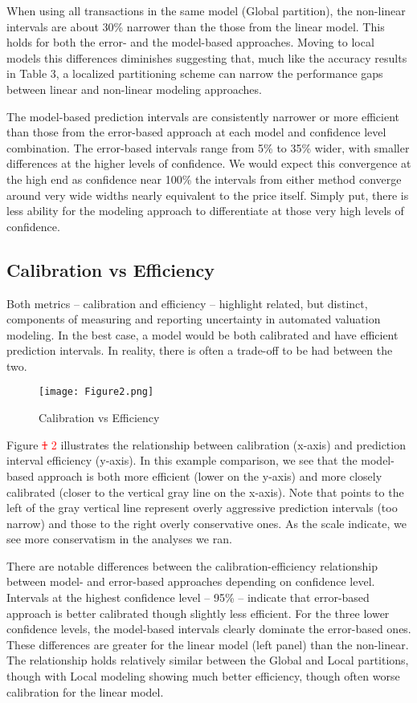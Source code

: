 \documentclass[colTwo]{anon}
\theoremstyle{definition}
\begin{document}
When using all transactions in the same model (Global partition), the non-linear intervals are about 30\% narrower than the those from the linear model.  This holds for both the error- and the model-based approaches. Moving to local models this differences diminishes suggesting that, much like the accuracy results in Table 3, a localized partitioning scheme can narrow the performance gaps between linear and non-linear modeling approaches. 

The model-based prediction intervals are consistently narrower or more efficient than those from the error-based approach at each model and confidence level combination. The error-based intervals range from 5\% to 35\% wider, with smaller differences at the higher levels of confidence.  We would expect this convergence at the high end as confidence near 100\% the intervals from either method converge around very wide widths nearly equivalent to the price itself.  Simply put, there is less ability for the modeling approach to differentiate at those very high levels of confidence.  

\subsection{Calibration vs Efficiency}

Both metrics -- calibration and efficiency -- highlight related, but distinct, components of measuring and reporting uncertainty in  automated valuation modeling.  In the best case, a model would be both calibrated and have efficient prediction intervals. In reality, there is often a trade-off to be had between the two.  

\begin{figure*}[h!]
\centering
\texttt{[image: Figure2.png]}
\caption{Calibration vs Efficiency}
\label{fig:calibsens}
\end{figure*}

Figure \textcolor{red}{\st{1} 2} illustrates the relationship between calibration (x-axis) and prediction interval efficiency (y-axis). In this example comparison, we see that the model-based approach is both more efficient (lower on the y-axis) and more closely calibrated (closer to the vertical gray line on the x-axis). Note that points to the left of the gray vertical line represent overly aggressive prediction intervals (too narrow) and those to the right overly conservative ones.  As the scale indicate, we see more conservatism in the analyses we ran.     

There are notable differences between the calibration-efficiency relationship between model- and error-based approaches depending on confidence level.  Intervals at the highest confidence level -- 95\% -- indicate that error-based approach is better calibrated though slightly less efficient. For the three lower confidence levels, the model-based intervals clearly dominate the error-based ones. These differences are greater for the linear model (left panel) than the non-linear.  The relationship holds relatively similar between the Global and Local partitions, though with Local modeling showing much better efficiency, though often worse calibration for the linear model.    
\end{document}
